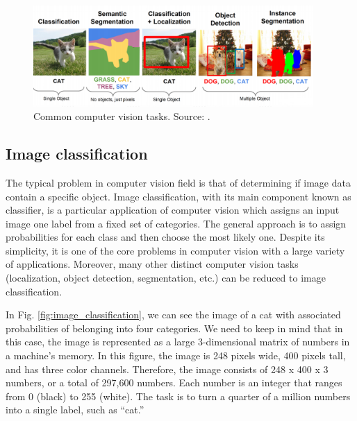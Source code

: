     \begin{figure}[ht]
        \centering
        \includegraphics[width=0.95\textwidth]{resources/computer-vision-tasks.png}
        \caption{Common computer vision tasks. Source: \cite{cs231n}.}
        \label{fig:computer-vision-tasks}
    \end{figure}
    
    \subsection{Image classification}
        The typical problem in computer vision field is that of determining if image data contain a specific object. Image classification, with its main component known as classifier, is a particular application of computer vision which assigns an input image one label from a fixed set of categories. The general approach is to assign probabilities for each class and then choose the most likely one. Despite its simplicity, it is one of the core problems in computer vision with a large variety of applications. Moreover, many other distinct computer vision tasks (localization, object detection, segmentation, etc.) can be reduced to image classification.
        
        In Fig. \ref{fig:image_classification}, we can see the image of a cat with associated probabilities of belonging into four categories. We need to keep in mind that in this case, the image is represented as a large 3-dimensional matrix of numbers in a machine's memory. In this figure, the image is 248 pixels wide, 400 pixels tall, and has three color channels. Therefore, the image consists of 248 x 400 x 3 numbers, or a total of 297,600 numbers. Each number is an integer that ranges from 0 (black) to 255 (white). The task is to turn a quarter of a million numbers into a single label, such as “cat.” \cite{cs231n}
        
